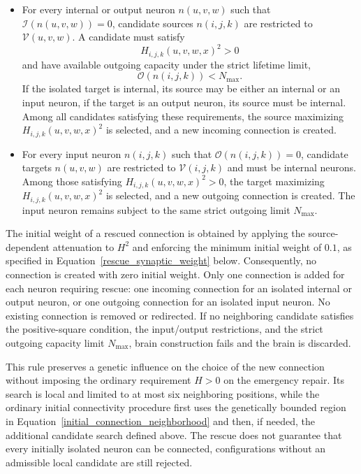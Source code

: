 \documentclass[12pt,a4paper]{article}
\begin{document}
\begin{enumerate}
	\begin{itemize}
		\item For every internal or output neuron $n(u,v,w)$ such that $\mathcal{I}(n(u,v,w))=0$, candidate sources $n(i,j,k)$ are restricted to $\mathcal{V}(u,v,w)$. A candidate must satisfy
		$$H_{i,j,k}(u,v,w,x)^2>0$$
		and have available outgoing capacity under the strict lifetime limit,
		$$\mathcal{O}(n(i,j,k))<N_{\max}.$$
		If the isolated target is internal, its source may be either an internal or an input neuron, if the target is an output neuron, its source must be internal. Among all candidates satisfying these requirements, the source maximizing $H_{i,j,k}(u,v,w,x)^2$ is selected, and a new incoming connection is created.

		\item For every input neuron $n(i,j,k)$ such that $\mathcal{O}(n(i,j,k))=0$, candidate targets $n(u,v,w)$ are restricted to $\mathcal{V}(i,j,k)$ and must be internal neurons. Among those satisfying $H_{i,j,k}(u,v,w,x)^2>0$, the target maximizing $H_{i,j,k}(u,v,w,x)^2$ is selected, and a new outgoing connection is created. The input neuron remains subject to the same strict outgoing limit $N_{\max}$.
	\end{itemize}

	The initial weight of a rescued connection is obtained by applying the source-dependent attenuation to $H^2$ and enforcing the minimum initial weight of $0.1$, as specified in Equation~\ref{rescue_synaptic_weight} below. Consequently, no connection is created with zero initial weight. Only one connection is added for each neuron requiring rescue: one incoming connection for an isolated internal or output neuron, or one outgoing connection for an isolated input neuron. No existing connection is removed or redirected. If no neighboring candidate satisfies the positive-square condition, the input/output restrictions, and the strict outgoing capacity limit $N_{\max}$, brain construction fails and the brain is discarded.

	This rule preserves a genetic influence on the choice of the new connection without imposing the ordinary requirement $H>0$ on the emergency repair. Its search is local and limited to at most six neighboring positions, while the ordinary initial connectivity procedure first uses the genetically bounded region in Equation~\ref{initial_connection_neighborhood} and then, if needed, the additional candidate search defined above. The rescue does not guarantee that every initially isolated neuron can be connected, configurations without an admissible local candidate are still rejected.


\end{enumerate}
\end{document}
